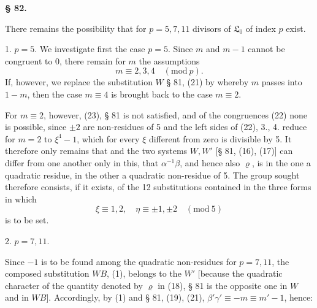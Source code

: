 
\begin{center}
\textbf{§ 82. }
\end{center}

There remains the possibility that for $p = 5, 7, 11$ divisors of $\mathfrak{L}_0$ of index $p$ exist.

1. $p = 5$. We investigate first the case $p = 5$. Since $m$ and $m - 1$ cannot be congruent to 0, there remain for $m$ the assumptions
\[
m \equiv 2, 3, 4 \quad (\mathrm{mod}\ p).
\]
If, however, we replace the substitution $W$ § 81, (21) by
whereby $m$ passes into $1 - m$, then the case $m \equiv 4$ is brought back to the case $m \equiv 2$.

For $m \equiv 2$, however, (23), § 81 is not satisfied, and of the congruences (22) none is possible, since $\pm 2$ are non-residues of 5 and the left sides of (22), 3., 4. reduce for $m = 2$ to $\xi^4 - 1$, which for every $\xi$ different from zero is divisible by 5. It therefore only remains that
and the two systems $W, W'$ [§ 81, (16), (17)] can differ from one another only in this, that $\alpha^{-1}\beta$, and hence also $\varrho$, is in the one a quadratic residue, in the other a quadratic non-residue of 5. The group sought therefore consists, if it exists, of the 12 substitutions contained in the three forms
in which
\[
\xi \equiv 1, 2, \quad \eta \equiv \pm 1, \pm 2 \quad (\mathrm{mod}\ 5)
\]
is to be set.

2. $p = 7, 11$.

Since $-1$ is to be found among the quadratic non-residues for $p = 7, 11$, the composed substitution $WB$, (1), belongs to the $W'$ [because the quadratic character of the quantity denoted by $\varrho$ in (18), § 81 is the opposite one in $W$ and in $WB$]. Accordingly, by (1) and § 81, (19), (21), $\beta'\gamma' \equiv -m \equiv m' - 1$, hence:
